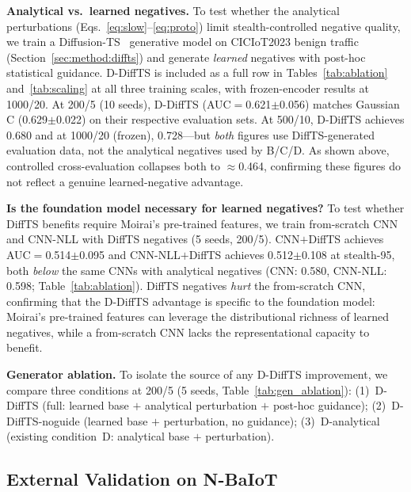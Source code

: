 \textbf{Analytical vs.\ learned negatives.}
To test whether the analytical perturbations (Eqs.~\ref{eq:slow}--\ref{eq:proto})
limit stealth-controlled negative quality, we train a
Diffusion-TS~\cite{zhang2024diffusionts} generative model on CICIoT2023 benign
traffic (Section~\ref{sec:method:diffts}) and generate \emph{learned}
negatives with post-hoc statistical guidance.
D-DiffTS is included as a full row in Tables~\ref{tab:ablation}
and~\ref{tab:scaling} at all three training scales, with frozen-encoder
results at 1000/20.
At 200/5 (10 seeds), D-DiffTS (AUC$=$0.621$\pm$0.056) matches Gaussian C
(0.629$\pm$0.022) on their respective evaluation sets.
At 500/10, D-DiffTS achieves 0.680 and at 1000/20 (frozen), 0.728---but
\emph{both} figures use DiffTS-generated evaluation data, not the analytical
negatives used by B/C/D.
As shown above, controlled cross-evaluation collapses both to $\approx$0.464,
confirming these figures do not reflect a genuine learned-negative advantage.

\textbf{Is the foundation model necessary for learned negatives?}
To test whether DiffTS benefits require Moirai's pre-trained features, we
train from-scratch CNN and CNN-NLL with DiffTS negatives (5 seeds, 200/5).
CNN$+$DiffTS achieves AUC$=$0.514$\pm$0.095 and CNN-NLL$+$DiffTS achieves
0.512$\pm$0.108 at stealth-95, both \emph{below} the same CNNs with
analytical negatives (CNN: 0.580, CNN-NLL: 0.598; Table~\ref{tab:ablation}).
DiffTS negatives \emph{hurt} the from-scratch CNN, confirming that the
D-DiffTS advantage is specific to the foundation model: Moirai's pre-trained
features can leverage the distributional richness of learned negatives,
while a from-scratch CNN lacks the representational capacity to benefit.

\textbf{Generator ablation.}
To isolate the source of any D-DiffTS improvement, we compare three
conditions at 200/5 (5 seeds, Table~\ref{tab:gen_ablation}):
(1)~D-DiffTS (full: learned base $+$ analytical perturbation $+$
post-hoc guidance);
(2)~D-DiffTS-noguide (learned base $+$ perturbation, no guidance);
(3)~D-analytical (existing condition~D: analytical base $+$ perturbation).



\subsection{External Validation on N-BaIoT}
\label{sec:experiments:nbaiot}

